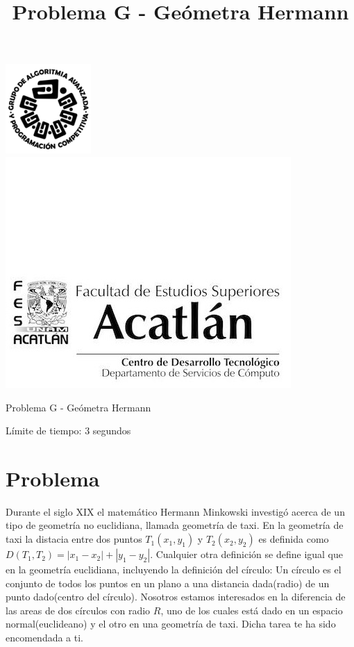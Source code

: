 \documentclass[letter,10pt]{article}
\date{}
\begin{document}
\title{Problema G - Geómetra Hermann}

\includegraphics[scale=0.6]{logo} \hspace*{9.00cm}
\includegraphics[scale=0.5]{dsc} 
\bigskip
\begin{center}
	\Large Problema G - Geómetra Hermann
\end{center}

\begin{flushright}
Límite de tiempo: 3 segundos
\par\end{flushright}
\bigskip

\section*{Problema}

Durante el siglo XIX el matemático Hermann Minkowski investigó acerca de
un tipo de geometría no euclidiana, llamada geometría de taxi. En la geometría
de taxi la distacia entre dos puntos $T_1(x_1,y_1)$ y $T_2(x_2, y_2)$ es definida
como $D(T_1, T_2) = |x_1-x_2|+|y_1-y_2|$. Cualquier otra definición se define
igual que en la geometría euclidiana, incluyendo la definición del círculo: Un
círculo es el conjunto de todos los puntos en un plano a una distancia 
dada(radio) de un punto dado(centro del círculo). Nosotros estamos interesados
en la diferencia de las areas de dos círculos con radio $R$, uno de los cuales 
está dado en un espacio normal(euclideano) y el otro en una geometría de taxi.
Dicha tarea te ha sido encomendada a ti.
 
\end{document}

